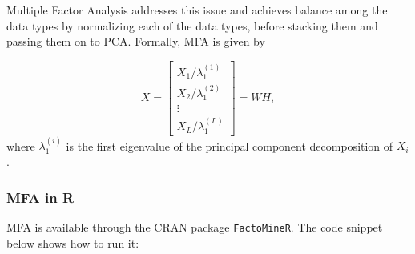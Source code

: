 \documentclass[12pt,]{krantz}
\newenvironment{Shaded}{\begin{snugshade}}{\end{snugshade}}
\newcommand{\DataTypeTok}[1]{\textcolor[rgb]{0.13,0.29,0.53}{#1}}
\newcommand{\DecValTok}[1]{\textcolor[rgb]{0.00,0.00,0.81}{#1}}
\newcommand{\FloatTok}[1]{\textcolor[rgb]{0.00,0.00,0.81}{#1}}
\newcommand{\KeywordTok}[1]{\textcolor[rgb]{0.13,0.29,0.53}{\textbf{#1}}}
\newcommand{\NormalTok}[1]{#1}
\newcommand{\OperatorTok}[1]{\textcolor[rgb]{0.81,0.36,0.00}{\textbf{#1}}}
\newcommand{\OtherTok}[1]{\textcolor[rgb]{0.56,0.35,0.01}{#1}}
\newcommand{\StringTok}[1]{\textcolor[rgb]{0.31,0.60,0.02}{#1}}
\begin{document}
Multiple Factor Analysis addresses this issue and achieves balance among the data types by normalizing each of the data types, before stacking them and passing them on to PCA. Formally, MFA is given by

\[
X = \begin{bmatrix}
           X_{1} / \lambda^{(1)}_1 \\
           X_{2} / \lambda^{(2)}_1 \\
           \vdots \\
           X_{L} / \lambda^{(L)}_1
         \end{bmatrix} = WH,
\]
where \(\lambda^{(i)}_1\) is the first eigenvalue of the principal component decomposition of \(X_i\).

\hypertarget{mfa-in-r}{%
\subsubsection{MFA in R}\label{mfa-in-r}}

MFA is available through the CRAN package \texttt{FactoMineR}. The code snippet below shows how to run it:

\begin{Shaded}
\end{Shaded}
\end{document}

